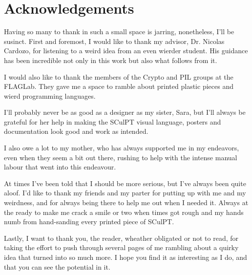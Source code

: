 
\chapter{Acknowledgements}

Having so many to thank in such a small space is jarring, nonetheless, I'll be susinct.
First and foremost, I would like to thank my advisor, Dr. Nicolas Cardozo, for listening to a weird idea from an even wierder student.
His guidance has been incredible not only in this work but also what follows from it.

I would also like to thank the members of the Crypto and PIL groups at the FLAGLab. They gave me a space to ramble about printed plastic pieces and
wierd programming languages.

I'll probably never be as good as a designer as my sister, Sara, but I'll always be grateful for
her help in making the SCulPT visual language, posters and documentation look good and work as intended.

I also owe a lot to my mother, who has always supported me in my endeavors, even when they seem a bit out there, rushing to help with the intense manual labour that went into this endeavour.

At times I've been told that I should be more serious, but I've always been quite aloof.
I'd like to thank my friends and my parter for putting up with me and my weirdness, and for always being there to help me out when I needed it.
Always at the ready to make me crack a smile or two when times got rough and my hands numb from hand-sanding every printed piece of SCulPT.

Lastly, I want to thank you, the reader, wheather obligated or not to read, for taking the effort to push through several pages of me rambling about
a quirky idea that turned into so much more.
I hope you find it as interesting as I do, and that you can see the potential in it.


\endinput

